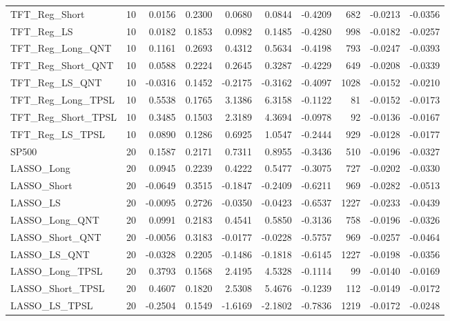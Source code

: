 \begin{tabular}{llrrrrrrrr}
\cline{1-10}
TFT\_Reg\_Short & 10 & 0.0156 & 0.2300 & 0.0680 & 0.0844 & -0.4209 & 682 & -0.0213 & -0.0356 \\
\cline{1-10}
TFT\_Reg\_LS & 10 & 0.0182 & 0.1853 & 0.0982 & 0.1485 & -0.4280 & 998 & -0.0182 & -0.0257 \\
\cline{1-10}
TFT\_Reg\_Long\_QNT & 10 & 0.1161 & 0.2693 & 0.4312 & 0.5634 & -0.4198 & 793 & -0.0247 & -0.0393 \\
\cline{1-10}
TFT\_Reg\_Short\_QNT & 10 & 0.0588 & 0.2224 & 0.2645 & 0.3287 & -0.4229 & 649 & -0.0208 & -0.0339 \\
\cline{1-10}
TFT\_Reg\_LS\_QNT & 10 & -0.0316 & 0.1452 & -0.2175 & -0.3162 & -0.4097 & 1028 & -0.0152 & -0.0210 \\
\cline{1-10}
TFT\_Reg\_Long\_TPSL & 10 & 0.5538 & 0.1765 & 3.1386 & 6.3158 & -0.1122 & 81 & -0.0152 & -0.0173 \\
\cline{1-10}
TFT\_Reg\_Short\_TPSL & 10 & 0.3485 & 0.1503 & 2.3189 & 4.3694 & -0.0978 & 92 & -0.0136 & -0.0167 \\
\cline{1-10}
TFT\_Reg\_LS\_TPSL & 10 & 0.0890 & 0.1286 & 0.6925 & 1.0547 & -0.2444 & 929 & -0.0128 & -0.0177 \\
\cline{1-10}
SP500 & 20 & 0.1587 & 0.2171 & 0.7311 & 0.8955 & -0.3436 & 510 & -0.0196 & -0.0327 \\
\cline{1-10}
LASSO\_Long & 20 & 0.0945 & 0.2239 & 0.4222 & 0.5477 & -0.3075 & 727 & -0.0202 & -0.0330 \\
\cline{1-10}
LASSO\_Short & 20 & -0.0649 & 0.3515 & -0.1847 & -0.2409 & -0.6211 & 969 & -0.0282 & -0.0513 \\
\cline{1-10}
LASSO\_LS & 20 & -0.0095 & 0.2726 & -0.0350 & -0.0423 & -0.6537 & 1227 & -0.0233 & -0.0439 \\
\cline{1-10}
LASSO\_Long\_QNT & 20 & 0.0991 & 0.2183 & 0.4541 & 0.5850 & -0.3136 & 758 & -0.0196 & -0.0326 \\
\cline{1-10}
LASSO\_Short\_QNT & 20 & -0.0056 & 0.3183 & -0.0177 & -0.0228 & -0.5757 & 969 & -0.0257 & -0.0464 \\
\cline{1-10}
LASSO\_LS\_QNT & 20 & -0.0328 & 0.2205 & -0.1486 & -0.1818 & -0.6145 & 1227 & -0.0198 & -0.0356 \\
\cline{1-10}
LASSO\_Long\_TPSL & 20 & 0.3793 & 0.1568 & 2.4195 & 4.5328 & -0.1114 & 99 & -0.0140 & -0.0169 \\
\cline{1-10}
LASSO\_Short\_TPSL & 20 & 0.4607 & 0.1820 & 2.5308 & 5.4676 & -0.1239 & 112 & -0.0149 & -0.0172 \\
\cline{1-10}
LASSO\_LS\_TPSL & 20 & -0.2504 & 0.1549 & -1.6169 & -2.1802 & -0.7836 & 1219 & -0.0172 & -0.0248 \\

\end{tabular}
